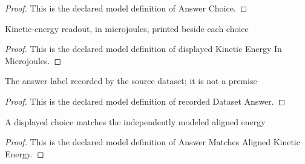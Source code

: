 \begin{proof}
  This is the declared model definition of Answer Choice.
\end{proof}
\begin{definition}
  \label{def:physics:phyx-mini-0856:phyxminiproblems-problemphyxmini0856-displayedkineticenergyinmicrojoules}
  Kinetic-energy readout, in microjoules, printed beside each choice
\end{definition}
\begin{proof}
  This is the declared model definition of displayed Kinetic Energy In Microjoules.
\end{proof}
\begin{definition}
  \label{def:physics:phyx-mini-0856:phyxminiproblems-problemphyxmini0856-recordeddatasetanswer}
  The answer label recorded by the source dataset; it is not a premise
\end{definition}
\begin{proof}
  This is the declared model definition of recorded Dataset Answer.
\end{proof}
\begin{definition}
  \label{def:physics:phyx-mini-0856:phyxminiproblems-problemphyxmini0856-answermatchesalignedkineticenergy}
  A displayed choice matches the independently modeled aligned energy
\end{definition}
\begin{proof}
  This is the declared model definition of Answer Matches Aligned Kinetic Energy.
\end{proof}
